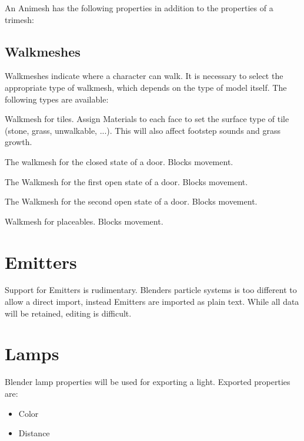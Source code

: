 An Animesh has the following properties in addition to the properties of a 
trimesh:

\subsection{Walkmeshes}
Walkmeshes indicate where a character can walk. It is necessary to select 
the appropriate type of walkmesh, which depends on the type of model itself. 
The following types are available:
\begin{description}[leftmargin=6em,style=nextline]
    \item[Tileset] Walkmesh for tiles. Assign Materials to each face to set the
                   surface type of tile (stone, grass, unwalkable, ...).
                   This will also affect footstep sounds and grass growth.
    \item[Door: Closed] The walkmesh for the closed state of a door. Blocks movement.
    \item[Door: Open 1] The Walkmesh for the first open state of a door. Blocks movement.
    \item[Door: Open 2] The Walkmesh for the second open state of a door. Blocks movement.
    \item[Placeable] Walkmesh for placeables. Blocks movement.
\end{description}

\section{Emitters}
Support for Emitters is rudimentary. Blenders particle systems is too
different to allow a direct import, instead Emitters are imported as plain
text. While all data will be retained, editing is difficult.

\section{Lamps}
Blender lamp properties will be used for exporting a light.
Exported properties are:
\begin{itemize}
\item Color
\item Distance
\end{itemize}

